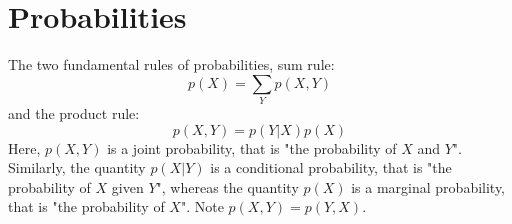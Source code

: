 \section{Probabilities}
The two fundamental rules of probabilities, sum rule:
\begin{equation}
    p(X) = \sum_Yp(X,Y)
\end{equation}
and the product rule:
\begin{equation}
    p(X,Y) = p(Y|X)p(X)
\end{equation}
Here, $p(X,Y)$ is a joint probability, that is "the probability of $X$ and $Y$". Similarly, the quantity $p(X|Y)$ is a conditional probability, that is "the probability of $X$ given $Y$", whereas the quantity $p(X)$ is a marginal probability, that is "the probability of $X$". Note $p(X,Y) = p(Y,X)$.